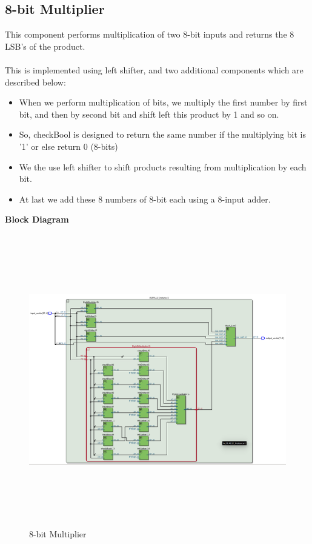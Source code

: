 \documentclass[12pt]{article}
\begin{document}
    \subsection{8-bit Multiplier}
        This component performs multiplication of two 8-bit inputs and returns the 8 LSB's of the product.\\\\
        This is implemented using left shifter, and two additional components which are described below:
        \begin{itemize}
            \item When we perform multiplication of bits, we multiply the first number by first bit, and then by second bit and shift left this product by 1 and so on.
            \item So, checkBool is designed to return the same number if the multiplying bit is '1' or else return 0 (8-bits)
            \item We the use left shifter to shift products resulting from multiplication by each bit.
            \item At last we add these 8 numbers of 8-bit each using a 8-input adder.
        \end{itemize}
        \noindent
        \textbf{Block Diagram}
        \begin{figure}[H]
            \centering
            \includegraphics[width=0.8\linewidth, height=5in]{eightmultiplier.png}
            \caption{8-bit Multiplier}
            \label{fig:instru}
        \end{figure} 
    
\end{document}
